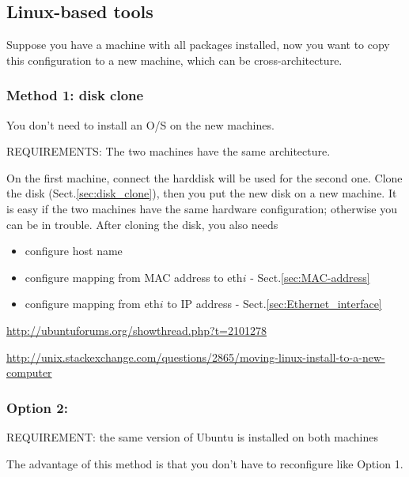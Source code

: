 \subsection{Linux-based tools}

Suppose you have a machine with all packages installed, now you want to copy
this configuration to a new machine, which can be cross-architecture. 

\subsubsection{Method 1: disk clone}

You don't need to install an O/S on the new machines.

REQUIREMENTS: The two machines have the same architecture.

On the first machine, connect the harddisk will be used for the second one.
Clone the disk (Sect.\ref{sec:disk_clone}), then you put the new disk on a new
machine. It is easy if the two machines have the same hardware configuration;
otherwise you can be in trouble. After cloning the disk, you also needs
\begin{itemize}
  \item configure host name
  \item configure mapping from MAC address to eth$i$ - Sect.\ref{sec:MAC-address}
  \item configure mapping from eth$i$ to IP address - Sect.\ref{sec:Ethernet_interface}
\end{itemize}


\url{http://ubuntuforums.org/showthread.php?t=2101278}

\url{http://unix.stackexchange.com/questions/2865/moving-linux-install-to-a-new-computer}

\subsubsection{Option 2: }

REQUIREMENT: the same version of Ubuntu is installed on both machines

The advantage of this method is that you don't have to reconfigure like Option
1.

